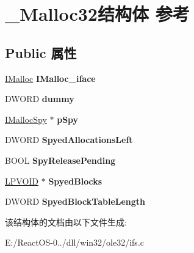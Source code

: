 \hypertarget{struct___malloc32}{}\section{\+\_\+\+Malloc32结构体 参考}
\label{struct___malloc32}
\subsection*{Public 属性}
\begin{DoxyCompactItemize}
\item 
\mbox{\label{struct___malloc32_a46a4230ab0008a3dcde6ad19e9dcaa36}} 
\hyperlink{interface_i_malloc}{I\+Malloc} {\bfseries I\+Malloc\+\_\+iface}
\item 
\mbox{\label{struct___malloc32_ad00c3c775642c82c53a1b1a5d4d7d056}} 
D\+W\+O\+RD {\bfseries dummy}
\item 
\mbox{\label{struct___malloc32_afccc335a31c6087ef9c21af6e3768562}} 
\hyperlink{interface_i_malloc_spy}{I\+Malloc\+Spy} $\ast$ {\bfseries p\+Spy}
\item 
\mbox{\label{struct___malloc32_ae35829b136d6be08ff7e656fe7140520}} 
D\+W\+O\+RD {\bfseries Spyed\+Allocations\+Left}
\item 
\mbox{\label{struct___malloc32_a4459385cbbc438ea85117853a04a3233}} 
B\+O\+OL {\bfseries Spy\+Release\+Pending}
\item 
\mbox{\label{struct___malloc32_abffd6e26106e453d7f5c75a5a156b708}} 
\hyperlink{interfacevoid}{L\+P\+V\+O\+ID} $\ast$ {\bfseries Spyed\+Blocks}
\item 
\mbox{\label{struct___malloc32_a8b4d38c156d7b2fdc883daa38994c345}} 
D\+W\+O\+RD {\bfseries Spyed\+Block\+Table\+Length}
\end{DoxyCompactItemize}


该结构体的文档由以下文件生成\+:\begin{DoxyCompactItemize}
\item 
E\+:/\+React\+O\+S-\/0../dll/win32/ole32/ifs.\+c\end{DoxyCompactItemize}
